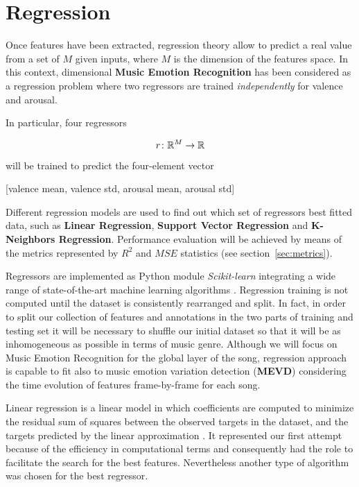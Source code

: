\section{Regression}\label{sec:regression} %

Once features have been extracted, regression theory allow to predict a real value from a set of $M$ given inputs, where $M$ is the dimension of the features space.
In this context, dimensional \textbf{Music Emotion Recognition} has been considered as a regression problem where two regressors are trained \textit{independently} for valence and arousal. 

In particular, four regressors

\[
	r \colon \mathbb{R}^{M} \to \mathbb{R}
\]

will be trained to predict the four-element vector

\begin{center}
	[valence mean, valence std, arousal mean, arousal std]
\end{center}

Different regression models are used to find out which set of regressors best fitted data, such as \textbf{Linear Regression}, \textbf{Support Vector Regression} and \textbf{K-Neighbors Regression}. Performance evaluation will be achieved by means of the metrics represented by $R^2$ and $MSE$ statistics (see section~\ref{sec:metrics}).

Regressors are implemented as Python module \textit{Scikit-learn} integrating a wide range of state-of-the-art machine learning algorithms \cite{scikit-learn}.
Regression training is not computed until the dataset is consistently rearranged and split. In fact, in order to split our collection of features and annotations in the two parts of training and testing set it will be necessary to shuffle our initial dataset so that it will be as inhomogeneous as possible in terms of music genre.
Although we will focus on Music Emotion Recognition for the global layer of the song, regression approach is capable to fit also to music emotion variation detection (\textbf{MEVD}) considering the time evolution of features frame-by-frame for each song.

Linear regression is a linear model in which coefficients are computed to minimize the residual sum of squares between the observed targets in the dataset, and the targets predicted by the linear approximation \cite{scikit-learn}.
It represented our first attempt because of the efficiency in computational terms and consequently had the role to facilitate the search for the best features. Nevertheless another type of algorithm was chosen for the best regressor.

